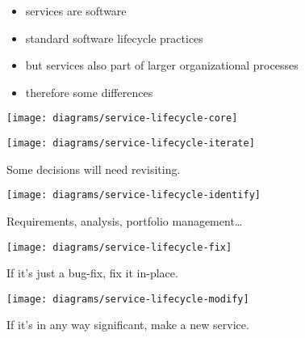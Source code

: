 \documentclass{sepslide-soa-faked} %
\begin{document}
\begin{slide}
\begin{itemize}
\item services are software
\item standard software lifecycle practices
\item but services also part of larger organizational processes
\item therefore some differences
\end{itemize}
\end{slide}

\begin{slide}
\begin{center}
\texttt{[image: diagrams/service-lifecycle-core]}
\end{center}
\end{slide}

\begin{slide}
\begin{center}
\texttt{[image: diagrams/service-lifecycle-iterate]}
\end{center}
Some decisions will need revisiting.
\end{slide}

\begin{slide}
\begin{center}
\texttt{[image: diagrams/service-lifecycle-identify]}
\end{center}
Requirements, analysis, portfolio management\ldots
\end{slide}

\begin{slide}
\begin{center}
\texttt{[image: diagrams/service-lifecycle-fix]}
\end{center}
If it's just a bug-fix, fix it in-place.
\end{slide}

\begin{slide}
\begin{center}
\texttt{[image: diagrams/service-lifecycle-modify]}
\end{center}
If it's in any way significant, make a new service.
\end{slide}
\end{document}
